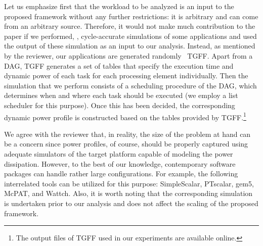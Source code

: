 \begin{authors}
Let us emphasize first that the workload to be analyzed is an input to the proposed framework without any further restrictions: it is arbitrary and can come from an arbitrary source.
Therefore, it would not make much contribution to the paper if we performed, \eg, cycle-accurate simulations of some applications and used the output of these simulation as an input to our analysis.
Instead, as mentioned by the reviewer, our applications are generated randomly \via\ TGFF.
Apart from a DAG, TGFF generates a set of tables that specify the execution time and dynamic power of each task for each processing element individually.
Then the simulation that we perform consists of a scheduling procedure of the DAG, which determines when and where each task should be executed (we employ a list scheduler for this purpose).
Once this has been decided, the corresponding dynamic power profile is constructed based on the tables provided by TGFF.\footnote{The output files of TGFF used in our experiments are available online.}

We agree with the reviewer that, in reality, the size of the problem at hand can be a concern since power profiles, of course, should be properly captured using adequate simulators of the target platform capable of modeling the power dissipation.
However, to the best of our knowledge, contemporary software packages can handle rather large configurations.
For example, the following interrelated tools can be utilized for this purpose: SimpleScalar, PTscalar, gem5, McPAT, and Wattch.
Also, it is worth noting that the corresponding simulation is undertaken prior to our analysis and does not affect the scaling of the proposed framework.

\begin{actions}
\end{actions}
\end{authors}


